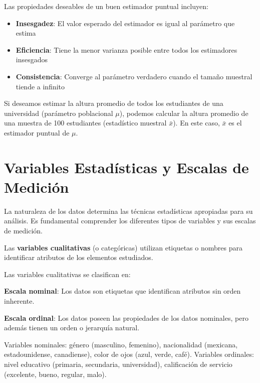 \begin{remark}
Las propiedades deseables de un buen estimador puntual incluyen:
\begin{itemize}
\item \textbf{Insesgadez}: El valor esperado del estimador es igual al parámetro que estima
\item \textbf{Eficiencia}: Tiene la menor varianza posible entre todos los estimadores insesgados
\item \textbf{Consistencia}: Converge al parámetro verdadero cuando el tamaño muestral tiende a infinito
\end{itemize}
\end{remark}

\begin{example}
Si deseamos estimar la altura promedio de todos los estudiantes de una universidad (parámetro poblacional $\mu$), podemos calcular la altura promedio de una muestra de 100 estudiantes (estadístico muestral $\bar{x}$). En este caso, $\bar{x}$ es el estimador puntual de $\mu$.
\end{example}

\section{Variables Estadísticas y Escalas de Medición}

La naturaleza de los datos determina las técnicas estadísticas apropiadas para su análisis. Es fundamental comprender los diferentes tipos de variables y sus escalas de medición.

\begin{definition}
Las \textbf{variables cualitativas} (o categóricas) utilizan etiquetas o nombres para identificar atributos de los elementos estudiados.
\end{definition}

Las variables cualitativas se clasifican en:

\begin{definition}
\textbf{Escala nominal}: Los datos son etiquetas que identifican atributos sin orden inherente.
\end{definition}

\begin{definition}
\textbf{Escala ordinal}: Los datos poseen las propiedades de los datos nominales, pero además tienen un orden o jerarquía natural.
\end{definition}

\begin{example}
Variables nominales: género (masculino, femenino), nacionalidad (mexicana, estadounidense, canadiense), color de ojos (azul, verde, café).
Variables ordinales: nivel educativo (primaria, secundaria, universidad), calificación de servicio (excelente, bueno, regular, malo).
\end{example}

